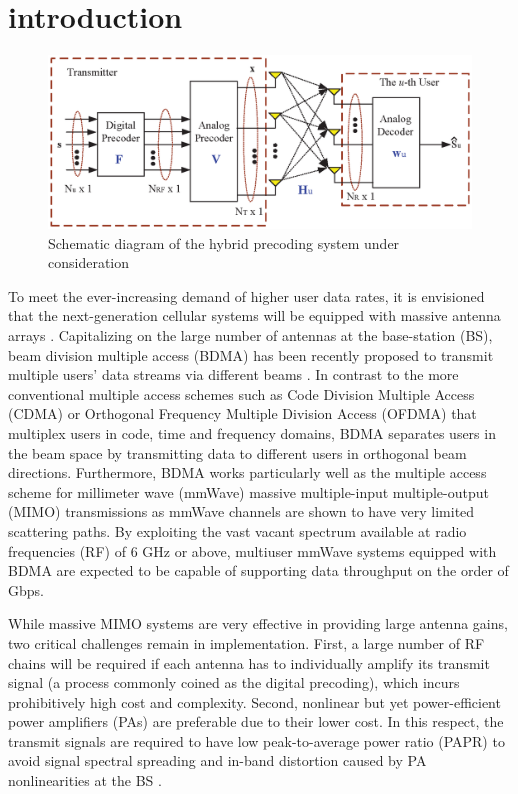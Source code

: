 \documentclass[conference]{IEEEtran}
\begin{document}
\section{introduction}
\begin{figure}[ht]
    \begin{center}
	\includegraphics[scale=0.85]{Figure/BlockDiagram.eps}
	\caption{Schematic diagram of the hybrid precoding system under consideration}\label{fig:BlockDiagram}
    \end{center}
\end{figure}

To meet the ever-increasing demand of higher user data rates, it is envisioned that the next-generation cellular systems will be equipped with massive antenna arrays \cite{boccardi2014five}. Capitalizing on the large number of antennas at the base-station (BS), beam division multiple access (BDMA) has been recently proposed to transmit multiple users' data streams via different beams \cite{sun2015beam, Jiang2018}. In contrast to the more conventional multiple access schemes such as Code Division Multiple Access (CDMA) or Orthogonal Frequency Multiple Division Access (OFDMA) that multiplex users in code, time and frequency domains, BDMA separates users in the beam space by transmitting data to different users in orthogonal beam directions. Furthermore, BDMA works particularly well as the multiple access scheme for millimeter wave (mmWave) massive multiple-input multiple-output (MIMO) transmissions as mmWave channels are shown to have very limited scattering paths\cite{alkhateeb2014channel}. By exploiting the vast vacant spectrum available at radio frequencies (RF) of $6$ GHz or above, multiuser mmWave systems equipped with BDMA are expected to be capable of supporting data throughput on the order of Gbps.

While massive MIMO systems are very effective in providing large antenna gains, two critical challenges remain in implementation. First, a large number of RF chains will be required if each antenna has to individually amplify its transmit signal (a process commonly coined as the digital precoding), which incurs prohibitively high cost and complexity. Second, nonlinear but yet power-efficient power amplifiers (PAs) are preferable due to their lower cost. In this respect, the transmit signals are required to have low peak-to-average power ratio (PAPR) to avoid signal spectral spreading and in-band distortion caused by PA nonlinearities at the BS \cite{mohammed2013per}.
\end{document}
